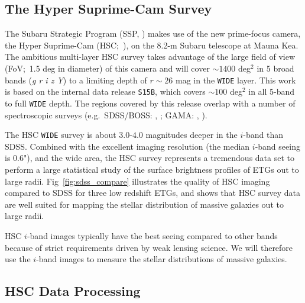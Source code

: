 \documentclass[a4paper,fleqn,usenatbib]{mnras}
\begin{document}
\subsection{The Hyper Suprime-Cam Survey}
    \label{ssec:hsc}

    The Subaru Strategic Program (SSP, \citealt{MiyazakiInPrep}) makes use of the new 
    prime-focus camera, the Hyper Suprime-Cam (HSC;~\citealt{Miyazaki2012}), on the 
    8.2-m Subaru telescope at Mauna Kea. 
    The ambitious multi-layer HSC survey takes advantage of the large field of 
    view (FoV;~1.5 deg in diameter) of this camera and will cover $\sim 1400$ deg$^2$ 
    in 5 broad bands (\textit{g r i z Y}) to a limiting depth of $r \sim 26$ mag 
    in the \texttt{WIDE} layer. 
    This work is based on the internal data release \texttt{S15B}, which covers 
    $\sim 100$ deg$^2$ in all 5-band to full \texttt{WIDE} depth.  
    The regions covered by this release overlap with a number of spectroscopic surveys 
    (e.g.\ SDSS/BOSS: \citealt{Eisenstein2011}, \citealt{Alam2015}; 
    GAMA: \citealt{Driver2011}, \citealt{Liske2015}).

    The HSC \texttt{WIDE} survey is about $3.0$-$4.0$ magnitudes deeper in the $i$-band 
    than SDSS. 
    Combined with the excellent imaging resolution (the median $i$-band seeing is 0.6"), 
    and the wide area, the HSC survey represents a tremendous data set to perform a 
    large statistical study of the surface brightness profiles of ETGs out to large radii.     
    Fig~\ref{fig:sdss_compare} illustrates the quality of HSC imaging compared to SDSS 
    for three low redshift ETGs, and shows that HSC survey data are well suited for 
    mapping the stellar distribution of massive galaxies out to large radii.

	HSC $i$-band images typically have the best seeing compared to other bands because 
	of strict requirements driven by weak lensing science. 
    We will therefore use the $i$-band images to measure the stellar distributions of 
    massive galaxies.
    
\subsection{HSC Data Processing}
    \label{sec:pipeline}
\end{document}

